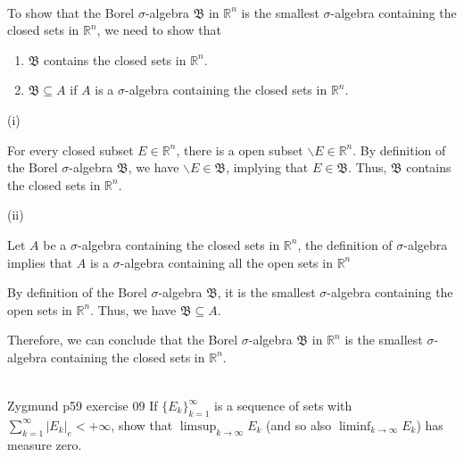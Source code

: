\documentclass[UTF8,a4paper,10pt]{article}
\begin{document}
  \begin{solution}\,

    To show that the Borel \(\sigma\)-algebra \(\mathfrak{B}\)  in \(\mathbb{R}^n\)  is the smallest \(\sigma\)-algebra containing the closed sets in \(\mathbb{R}^n\), we need to show that 

    \begin{enumerate}[label=(\roman*)]
      \item \(\mathfrak{B}\) contains the closed sets in \(\mathbb{R}^n\).
      \item \(\mathfrak{B} \subseteq A\) if \(A\) is a \(\sigma\)-algebra containing the closed sets in \(\mathbb{R}^n\).
    \end{enumerate}

(i)

For every closed subset \(E \in\mathbb{R}^n\), there is a open subset \(\backslash E \in \mathbb{R}^n\). By definition of the Borel \(\sigma\)-algebra \(\mathfrak{B}\), we have \(\backslash E \in \mathfrak{B}\), implying that \(E\in \mathfrak{B}\). Thus, \(\mathfrak{B}\) contains the closed sets in \(\mathbb{R}^n\).

(ii)

Let \(A\) be a \(\sigma\)-algebra containing the closed sets in \(\mathbb{R}^n\), the definition of \(\sigma\)-algebra implies that \(A\) is a \(\sigma\)-algebra containing all the open sets in \(\mathbb{R}^n\)

By definition of the Borel \(\sigma\)-algebra \(\mathfrak{B}\), it is the smallest \(\sigma\)-algebra containing the open sets in \(\mathbb{R}^n\). Thus, we have \(\mathfrak{B} \subseteq A\).

Therefore, we can conclude that the Borel \(\sigma\)-algebra \(\mathfrak{B}\)  in \(\mathbb{R}^n\)  is the smallest \(\sigma\)-algebra containing the closed sets in \(\mathbb{R}^n\).



\begin{equation*}
  \begin{aligned}
  \end{aligned}
\end{equation*}


  \end{solution}

  
  \begin{Problem}[]{Zygmund p59 exercise 09}
    If \(\{E_k\}_{k=1}^{\infty}\) is a sequence of sets with \(\sum_{k=1}^{\infty}|E_k|_e<+\infty\), show that \(\limsup_{k\to\infty}E_k\)
    (and so also \(\liminf_{k\to\infty}E_k\)) has measure zero.
  \end{Problem}
\end{document}
